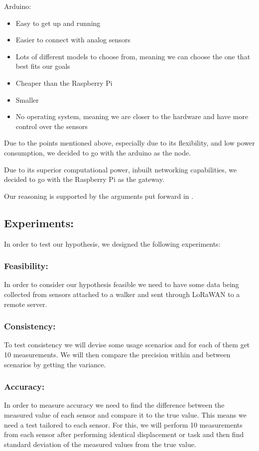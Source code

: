 Arduino:
\begin{itemize}
	\item Easy to get up and running
	\item Easier to connect with analog sensors
	\item Lots of different models to choose from, meaning we can choose the one that best fits our goals
	\item Cheaper than the Raspberry Pi
	\item Smaller 
	\item No operating system, meaning we are closer to the hardware and have more control over the sensors
\end{itemize}



Due to the points mentioned above, especially due to its flexibility, and low power consumption, we decided to go with the arduino as the node.

Due to its superior computational power, inbuilt networking capabilities, we decided to go with the Raspberry Pi as the gateway.

Our reasoning is supported by the arguments put forward in \cite{postolache2011smart}.


\subsection{Experiments:}
In order to test our hypothesis, we designed the following experiments:

\subsubsection{Feasibility:}
In order to consider our hypothesis feasible we need to have some data being collected from sensors attached to a walker and sent through LoRaWAN to a remote server.

\subsubsection{Consistency:}
To test consistency we will devise some usage scenarios and for each of them get 10 measurements. We will then compare the precision within and between scenarios by getting the variance.

\subsubsection{Accuracy:}
In order to measure accuracy we need to find the difference between the measured value of each sensor and compare it to the true value. This means we need a test tailored to each sensor. For this, we will perform 10 measurements from each sensor after performing identical displacement or task and then find standard deviation of the measured values from the true value.

